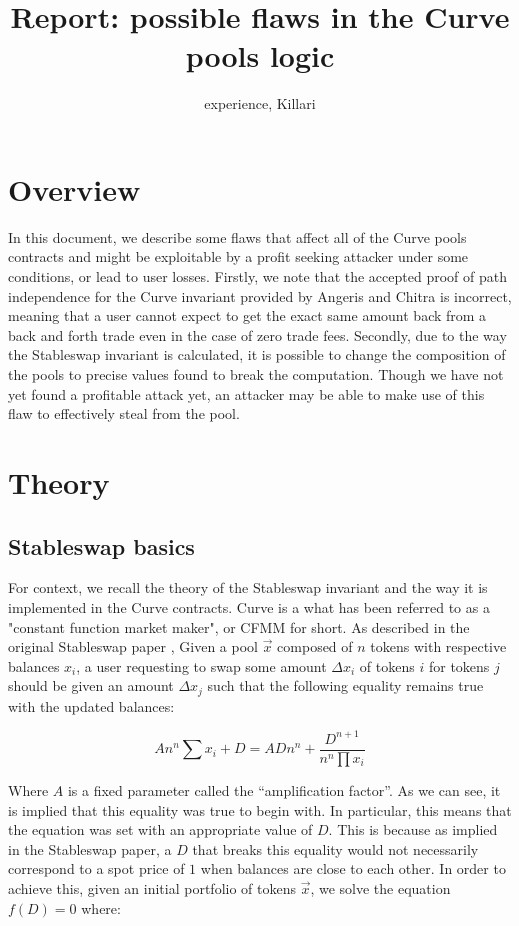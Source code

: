 \documentclass{article}
\title{Report: possible flaws in the Curve pools logic}
\author{experience, Killari}
\begin{document}
    \maketitle

    \section{Overview}

    In this document, we describe some flaws that affect all of the Curve pools contracts and might be exploitable by a profit seeking attacker under some conditions, or lead to user losses. Firstly, we note that the accepted proof of path independence for the Curve invariant provided by Angeris and Chitra \cite{angeris2020} is incorrect, meaning that a user cannot expect to get the exact same amount back from a back and forth trade even in the case of zero trade fees. Secondly, due to the way the Stableswap invariant is calculated, it is possible to change the composition of the pools to precise values found to break the computation. Though we have not yet found a profitable attack yet, an attacker may be able to make use of this flaw to effectively steal from the pool. 

    \section{Theory}

    \subsection{Stableswap basics}

    For context, we recall the theory of the Stableswap invariant and the way it is implemented in the Curve contracts. Curve is a what has been referred to as a "constant function market maker", or CFMM for short. As described in the original Stableswap paper \cite{stableswap2019}, Given a pool $\vec{x}$ composed of $n$ tokens with respective balances $x_{i}$, a user requesting to swap some amount $\Delta x_{i}$ of tokens $i$ for tokens $j$ should be given an amount $\Delta x_{j}$ such that the following equality remains true with the updated balances: 

    \begin{equation}
        A n^{n} \sum x_{i}+D=A D n^{n}+\frac{D^{n+1}}{n^{n} \prod x_{i}}
    \end{equation}

    Where $A$ is a fixed parameter called the ``amplification factor''. As we can see, it is implied that this equality was true to begin with. In particular, this means that the equation was set with an appropriate value of $D$. This is because as implied in the Stableswap paper, a $D$ that breaks this equality would not necessarily correspond to a spot price of $1$ when balances are close to each other. In order to achieve this, given an initial portfolio of tokens $\vec{x}$, we solve the equation $f(D) = 0$ where: 
\end{document}
